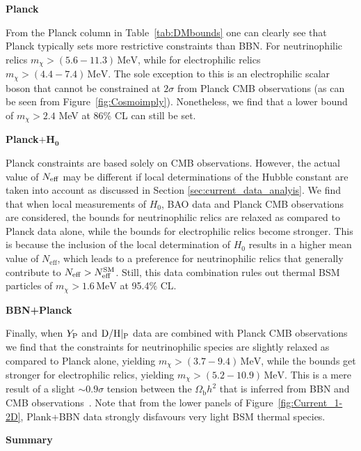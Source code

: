 \noindent\textbf{Planck} 

\noindent From the Planck column in Table~\ref{tab:DMbounds} one can clearly see that Planck typically sets more restrictive constraints than BBN. For neutrinophilic relics $m_\chi > (5.6-11.3)\,\text{MeV}$, while for electrophilic relics $m_\chi > (4.4-7.4)\,\text{MeV}$. The sole exception to this is an electrophilic scalar boson that cannot be constrained at $2\sigma$ from Planck CMB observations (as can be seen from Figure~\ref{fig:Cosmoimply}). Nonetheless, we find that a lower bound of $m_\chi > 2.4$ MeV at 86\% CL can still be set.

\vspace{0.2cm}

\noindent\textbf{Planck}$\boldsymbol{+H_0}$


\noindent Planck constraints are based solely on CMB observations. However, the actual value of $N_{\rm eff}$ may be different if local determinations of the Hubble constant are taken into account as discussed in Section \ref{sec:current_data_analyis}. We find that when local measurements of $H_0$, BAO data and Planck CMB observations are considered, the bounds for neutrinophilic relics are relaxed as compared to Planck data alone, while the bounds for electrophilic relics become stronger. This is because the inclusion of the local determination of $H_0$ results in a higher mean value of $N_{\mathrm{eff}}$, which leads to a preference for neutrinophilic relics that generally contribute to $N_{\mathrm{eff}} > N_{\mathrm{eff}}^{\rm SM}$. Still, this data combination rules out thermal BSM particles of $m_\chi > 1.6\,\text{MeV}$ at 95.4\% CL.

\vspace{0.2cm}

\noindent\textbf{BBN+Planck}

\noindent Finally, when $Y_{\rm P}$ and  ${\rm D/H}|_{\rm P}$ data are combined with Planck CMB observations we find that the constraints for neutrinophilic species are slightly relaxed as compared to Planck alone, yielding $m_\chi > (3.7-9.4)\,\text{MeV}$, while the bounds get stronger for electrophilic relics, yielding $m_\chi > (5.2-10.9)\,\text{MeV}$. This is a mere result of a slight $\sim 0.9\sigma $ tension between the $\Omega_{\mathrm{b}}h^2$ that is inferred from BBN and CMB observations~\cite{Pitrou:2018cgg}. Note that from the lower panels of Figure~\ref{fig:Current_1-2D}, Plank+BBN data strongly disfavours very light BSM thermal species.

\noindent\textbf{Summary} 


